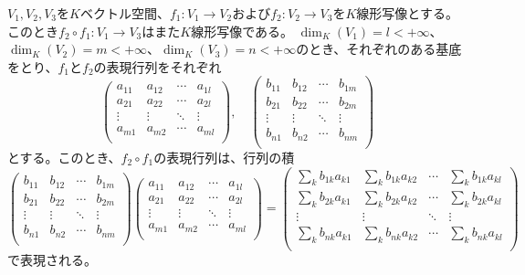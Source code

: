 \begin{theorem}
  $V_1,V_2,V_3$を$K$ベクトル空間、$f_1:V_1\to V_2$および$f_2:V_2\to V_3$を$K$線形写像とする。
  このとき$f_2\circ f_1:V_1\to V_3$はまた$K$線形写像である。
  $\dim_K(V_1)=l<+\infty$、$\dim_K(V_2)=m<+\infty$、$\dim_K(V_3)=n<+\infty$のとき、それぞれのある基底をとり、$f_1$と$f_2$の表現行列をそれぞれ
  \[
    \begin{pmatrix}
      a_{11} & a_{12} & \cdots & a_{1l}\\
      a_{21} & a_{22} & \cdots & a_{2l}\\
      \vdots & \vdots & \ddots & \vdots\\
      a_{m1} & a_{m2} & \cdots & a_{ml}\\
    \end{pmatrix},\quad
    \begin{pmatrix}
      b_{11} & b_{12} & \cdots & b_{1m}\\
      b_{21} & b_{22} & \cdots & b_{2m}\\
      \vdots & \vdots & \ddots & \vdots\\
      b_{n1} & b_{n2} & \cdots & b_{nm}\\
    \end{pmatrix}
  \]
  とする。このとき、$f_2\circ f_1$の表現行列は、行列の積
  \[
    \begin{pmatrix}
      b_{11} & b_{12} & \cdots & b_{1m}\\
      b_{21} & b_{22} & \cdots & b_{2m}\\
      \vdots & \vdots & \ddots & \vdots\\
      b_{n1} & b_{n2} & \cdots & b_{nm}\\
    \end{pmatrix}
    \begin{pmatrix}
      a_{11} & a_{12} & \cdots & a_{1l}\\
      a_{21} & a_{22} & \cdots & a_{2l}\\
      \vdots & \vdots & \ddots & \vdots\\
      a_{m1} & a_{m2} & \cdots & a_{ml}\\
    \end{pmatrix}
    =
    \begin{pmatrix}
      \sum_kb_{1k}a_{k1} & \sum_kb_{1k}a_{k2} & \cdots & \sum_kb_{1k}a_{kl}\\
      \sum_kb_{2k}a_{k1} & \sum_kb_{2k}a_{k2} & \cdots & \sum_kb_{2k}a_{kl}\\
      \vdots & \vdots & \ddots & \vdots\\
      \sum_kb_{nk}a_{k1} & \sum_kb_{nk}a_{k2} & \cdots & \sum_kb_{nk}a_{kl}\\
    \end{pmatrix}
  \]
  で表現される。
\end{theorem}


